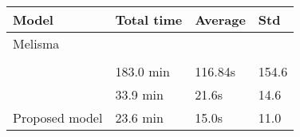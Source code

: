 \begin{tabular}{l|lll}
    Model                        & Total time & Average & Std   \\
    \hline
    Melisma                      &            &         &       \\
    \textcite{chen2021attend}    &            &         &       \\
    \textcite{mcleod2021modular} & 183.0 min  & 116.84s & 154.6 \\
    \textcite{micchi2020not}     & 33.9 min   & 21.6s   & 14.6  \\
    Proposed model               & 23.6 min   & 15.0s   & 11.0  \\
\end{tabular}
